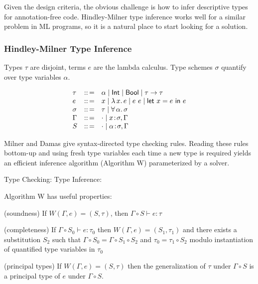 \documentclass{article}
\begin{document}
Given the design criteria, the obvious challenge is how to infer descriptive
 types for annotation-free code.
Hindley-Milner type inference works well for a similar problem in ML programs,
 so it is a natural place to start looking for a solution.


\subsubsection*{Hindley-Milner Type Inference}

Types $\tau$ are disjoint, terms $e$ are the lambda calculus.
Type schemes $\sigma$ quantify over type variables $\alpha$.


\[\begin{array}{l c l}
  \tau & ::\,= & \alpha \mid \mathsf{Int} \mid \mathsf{Bool} \mid \tau \rightarrow \tau
\\ e   & ::\,= & x \mid \lambda\,x.\,e \mid e~e \mid \mathsf{let}~x = e~\mathsf{in}~e
\\\sigma & ::\,= & \tau \mid \forall\,\alpha.\,\sigma
\\\Gamma & ::\,= & \cdot \mid x\!:\!\sigma,\Gamma
\\ S & ::\,= & \cdot \mid \alpha\!:\!\sigma,\Gamma
  \end{array}\]

Milner and Damas give syntax-directed type checking rules.
Reading these rules bottom-up and using fresh type variables each time a new
 type is required yields an efficient inference algorithm (Algorithm W)
 parameterized by a solver.

Type Checking: 
\qquad\qquad
Type Inference: 

\noindent Algorithm W has useful properties:

\begin{theorem}
  (soundness) If $W(\Gamma, e) = (S, \tau)$, then $\Gamma\circ S \vdash e : \tau$
\end{theorem}

\begin{theorem}
  (completeness) If $\Gamma\circ S_0 \vdash e : \tau_0$ then $W(\Gamma, e) =
  (S_1, \tau_1)$ and there exists a substitution $S_2$ such that $\Gamma \circ
  S_0 = \Gamma \circ S_1 \circ S_2$ and $\tau_0 = \tau_1 \circ S_2$ modulo
  instantiation of quantified type variables in $\tau_0$
\end{theorem}

\begin{theorem}
  (principal types) If $W(\Gamma,e) = (S,\tau)$ then the generalization
  of $\tau$ under $\Gamma \circ S$ is a principal type of $e$ under $\Gamma \circ S$.
\end{theorem}
\end{document}
